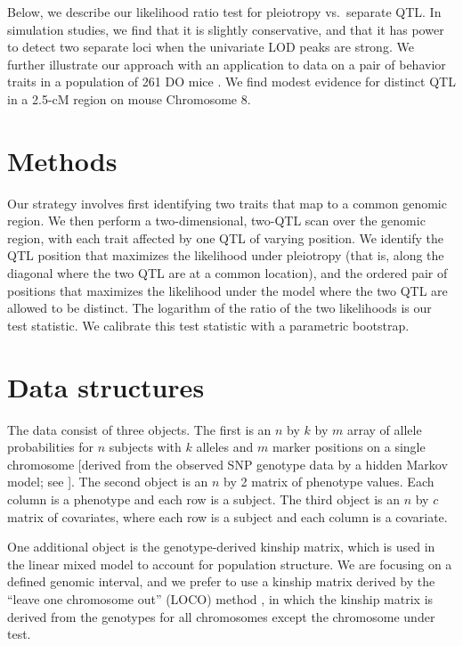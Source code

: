 \documentclass[oneside]{book}\usepackage[]{graphicx}\usepackage[]{color}
\begin{document}
Below, we describe our likelihood ratio test for pleiotropy vs.\
separate QTL. In simulation studies, we find that it is slightly
conservative, and that it has power to detect two separate loci when
the univariate LOD peaks are strong. We further illustrate our
approach with an application to data on a pair of behavior traits in
a population of 261 DO mice \citep{logan2013high,recla2014precise}.
We find modest evidence for distinct QTL in a 2.5-cM region on mouse
Chromosome 8.


\section{Methods}
\label{sec:materials:methods}

Our strategy involves first identifying two traits that map to a common
genomic region. We then perform a two-dimensional, two-QTL scan over
the genomic region, with each trait affected by one QTL of varying
position. We identify the QTL position that maximizes the likelihood
under pleiotropy (that is, along the diagonal where the two QTL are at
a common location), and the ordered pair of positions that maximizes
the likelihood under the model where the two QTL are allowed to be
distinct. The logarithm of the ratio of the two likelihoods is our
test statistic. We calibrate this test statistic with a parametric
bootstrap.

\section{Data structures}

The data consist of three objects. The first is an $n$ by $k$ by $m$
array of allele probabilities for $n$ subjects with $k$ alleles and
$m$ marker positions on a single chromosome [derived from the observed
SNP genotype data by a hidden Markov model; see
\citet{broman2019rqtl2}]. The second object is an $n$ by 2 matrix of
phenotype values. Each column is a phenotype and each row is a
subject. The third object is an $n$ by $c$ matrix of covariates, where
each row is a subject and each column is a covariate.

One additional object is the genotype-derived kinship matrix, which is
used in the linear mixed model to account for population structure. We
are focusing on a defined genomic interval, and we prefer to use a
kinship matrix derived by the ``leave one chromosome out'' (LOCO)
method \citep{yang2014advantages}, in which the kinship matrix is
derived from the genotypes for all chromosomes except the chromosome
under test.
\end{document}
